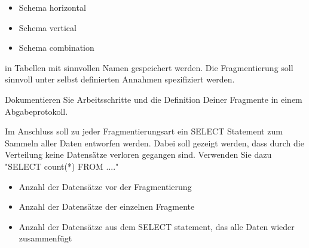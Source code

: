 \begin{itemize}
	\item Schema horizontal
	\item Schema vertical
	\item Schema combination
\end{itemize}
in Tabellen mit sinnvollen Namen gespeichert werden. Die Fragmentierung soll sinnvoll unter selbst definierten Annahmen spezifiziert werden.

Dokumentieren Sie Arbeitsschritte und die Definition Deiner Fragmente in einem Abgabeprotokoll.

Im Anschluss soll zu jeder Fragmentierungsart ein SELECT Statement zum Sammeln aller Daten entworfen werden. Dabei soll gezeigt werden, dass durch die Verteilung keine Datensätze verloren gegangen sind. Verwenden Sie dazu "SELECT count(*) FROM ...."

\begin{itemize}
	\item Anzahl der Datensätze vor der Fragmentierung
	\item Anzahl der Datensätze der einzelnen Fragmente
	\item Anzahl der Datensätze aus dem SELECT statement, das alle Daten wieder zusammenfügt
\end{itemize}
\clearpage
